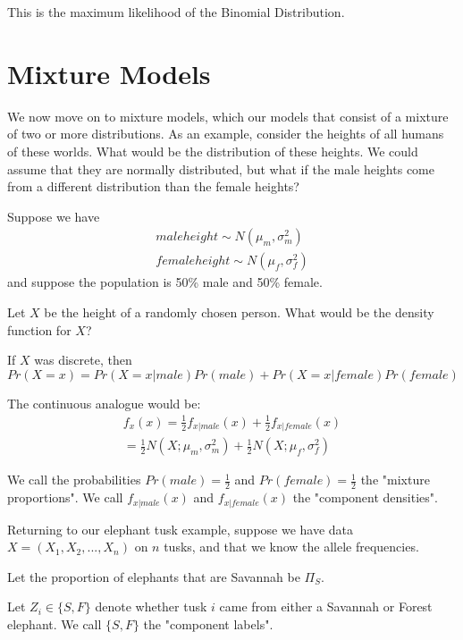 \documentclass[10pt,a4paper]{article}
\begin{document}
This is the maximum likelihood of the Binomial Distribution.

\section{Mixture Models}
We now move on to mixture models, which our models that consist of a mixture of two or more distributions. As an example, consider the heights of all humans of these worlds. What would be the distribution of these heights. We could assume that they are normally distributed, but what if the male heights come from a different distribution than the female heights?

Suppose we have \begin{equation}
\begin{aligned}
male height\sim N(\mu_m,\sigma^2_m)\\
female height \sim N(\mu_f,\sigma^2_f)
\end{aligned}
\end{equation} and suppose the population is 50\% male and 50\% female.

Let $X$ be the height of a randomly chosen person. What would be the density function for $X$?

If $X$ was discrete, then \begin{equation}
Pr(X=x) = Pr(X = x|male)Pr(male) + Pr(X=x|female)Pr(female)
\end{equation}

The continuous analogue would be:
\begin{equation}
\begin{aligned}
f_x(x) = \frac{1}{2}f_{x|male}(x) + \frac{1}{2}f_{x|female}(x) \\
= \frac{1}{2}N(X;\mu_m,\sigma^2_m) +  \frac{1}{2}N(X;\mu_f,\sigma^2_f)
\end{aligned}
\end{equation}

We call the probabilities $Pr(male) = \frac{1}{2}$ and $Pr(female) = \frac{1}{2}$ the "mixture proportions". We call $f_{x|male}(x)$ and $f_{x|female}(x)$ the "component densities".

Returning to our elephant tusk example, suppose we have data $X = (X_1,X_2,...,X_n)$ on $n$ tusks, and that we know the allele frequencies. 

Let the proportion of elephants that are Savannah be $\Pi_S$. 

Let $Z_i \in \lbrace S,F\rbrace$ denote whether tusk $i$ came from either a Savannah or Forest elephant. We call $\lbrace S,F\rbrace$ the "component labels".
\end{document}
